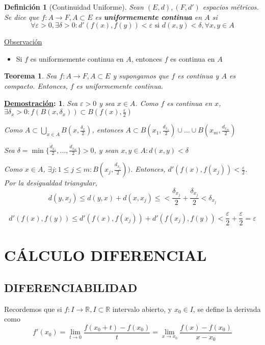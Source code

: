 \documentclass[10pt,a4paper,openright]{book}
\theoremstyle{break}
\newtheorem*{defi}{Definición}
\newtheorem*{theo}{Teorema}
\newtheorem*{demo}{\underline{Demostración}:}
\begin{document}
\begin{defi}[Continuidad Uniforme]
Sean $(E,d), (F, d')$ espacios métricos. Se dice que $f: A \to F, A \subset E$ es \textbf{uniformemente continua} en $A$ si $$\forall \varepsilon > 0, \exists \delta > 0 : d'(f(x), f(y)) < \varepsilon \mbox{ si } d(x,y) < \delta, \forall x,y \in A$$
\end{defi}

\underline{Observación}
\begin{itemize}
\item Si $f$ es uniformemente continua en $A$, entonces $f$ es continua en $A$
\end{itemize}

\begin{theo}
Sea $f: A \to F, A \subset E$ y supongamos que $f$ es continua y $A$ es compacto. Entonces, $f$ es uniformemente continua.
\end{theo}

\begin{demo}
Sea $\varepsilon > 0$ y sea $x \in A$. Como $f$ es continua en $x$, $\exists \delta_x > 0 : f(B(x, \delta_x)) \subset B(f(x), \frac{\varepsilon}{2})$

Como $A \subset \bigcup_{x \in A} B(x, \frac{\delta_x}{2})$, entonces $A \subset B(x_1, \frac{d_{x_1}}{2}) \cup \ldots \cup B(x_m,  \frac{d_{x_m}}{2})$

Sea $\delta = \min\{ \frac{d_{x_1}}{2}, \ldots,  \frac{d_{x_m}}{2}\} > 0$, y sean $x,y \in A : d(x,y) < \delta$

Como $x\in A$, $\exists j : 1 \leq j \leq m : B(x_j,  \frac{d_{x_j}}{2}))$. Entonces, $d'(f(x), f(x_j)) < \frac{\varepsilon}{2}$. Por la desigualdad triangular, $$d(y,x_j) \leq d(y,x) + d(x,x_j) \leq < \frac{\delta _{x_j}}{2} + \frac{\delta _{x_j}}{2} < \delta _{x_j}$$

$$d'(f(x), f(y)) \leq d'(f(x), f(x_j)) + d'(f(x_j), f(y)) < \frac{\varepsilon}{2} + \frac{\varepsilon}{2} = \varepsilon$$
\end{demo}


\chapter*{CÁLCULO DIFERENCIAL}
\section*{DIFERENCIABILIDAD}

Recordemos que si $f: I \to \mathbb{R}, I \subset \mathbb{R}$ intervalo abierto, y $x_0 \in I$, se define la derivada como 
$$f'(x_0)= \lim_{t \to 0} \frac{f(x_0 + t) - f(x_0) }{t} = \lim_{x \to x_0} \frac{f(x) - f(x_0)}{x - x_0}$$
\end{document}
